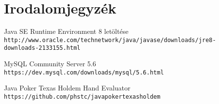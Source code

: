 \chapter{Irodalomjegyzék}

\begin{thebibliography}{9}
Java SE Runtime Environment 8 letöltése
\\\texttt{http://www.oracle.com/technetwork/java/javase/downloads/jre8-downloads-2133155.html}

MySQL Community Server 5.6
\\\texttt{https://dev.mysql.com/downloads/mysql/5.6.html}

Java Poker Texas Holdem Hand Evaluator
\\\texttt{https://github.com/phstc/javapokertexasholdem}
\end{thebibliography}
